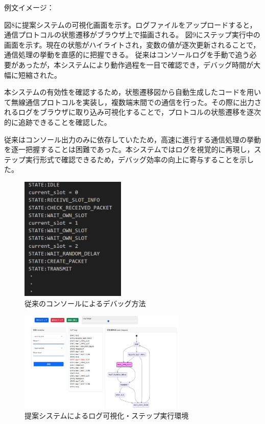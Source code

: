 \documentclass[technicalreport]{ieicej}
\begin{document}
例文イメージ：

図8に提案システムの可視化画面を示す。ログファイルをアップロードすると，通信プロトコルの状態遷移がブラウザ上で描画される。
図9にステップ実行中の画面を示す。現在の状態がハイライトされ，変数の値が逐次更新されることで，通信処理の挙動を直感的に把握できる。
従来はコンソールログを手動で追う必要があったが，本システムにより動作過程を一目で確認でき，デバッグ時間が大幅に短縮された。


本システムの有効性を確認するため，状態遷移図から自動生成したコードを用いて無線通信プロトコルを実装し，複数端末間での通信を行った。その際に出力されるログをブラウザに取り込み可視化することで，プロトコルの状態遷移を逐次的に追跡できることを確認した。

従来はコンソール出力のみに依存していたため，高速に進行する通信処理の挙動を逐一把握することは困難であった。本システムではログを視覚的に再現し，ステップ実行形式で確認できるため，デバッグ効率の向上に寄与することを示した。
\begin{figure}[tb]
  \centering
  \includegraphics[width=50mm]{./images/old_debug.png}
  \caption{従来のコンソールによるデバッグ方法}
  \label{fig:old-debug}
\end{figure}
\begin{figure}[tb]
  \centering
  \includegraphics[width=80mm]{./images/step_3.png}
  \caption{提案システムによるログ可視化・ステップ実行環境}
  \label{fig:viewer-ui}
\end{figure}
\end{document}
